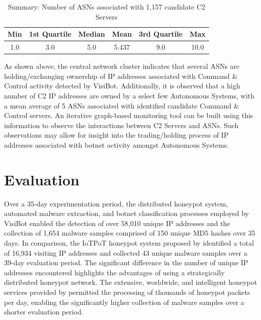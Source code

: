 \begin{table}[!htb]
    \centering
    \caption{Summary: Number of ASNs associated with 1,157 candidate C2 Servers}
    \label{tab:c2_asn_history_summary}
    \begin{tabular}{|c|c|c|c|c|c|}
    \hline
    \textbf{Min} & \textbf{1st Quartile} & \textbf{Median} & \textbf{Mean} & \textbf{3rd Quartile} & \textbf{Max} \\ \hline
    1.0 & 3.0 & 5.0 & 5.437 & 9.0 & 10.0 \\ \hline
    \end{tabular}
\end{table}

As shown above, the central network cluster indicates that several ASNs are holding/exchanging ownership of IP addresses associated with Command \& Control activity detected by VisiBot. Additionally, it is observed that a high number of C2 IP addresses are owned by a select few Autonomous Systems, with a mean average of 5 ASNs associated with identified candidate Command \& Control servers. An iterative graph-based monitoring tool can be built using this information to observe the interactions between C2 Servers and ASNs. Such observations may allow for insight into the trading/holding process of IP addresses associated with botnet activity amongst Autonomous Systems.


\section{Evaluation}

Over a 35-day experimentation period, the distributed honeypot system, automated malware extraction, and botnet classification processes employed by VisiBot enabled the detection of over 58,010 unique IP addresses and the collection of 1,654 malware samples comprised of 150 unique MD5 hashes over 35 days. In comparison, the IoTPoT honeypot system proposed by \citet{PaPa2016} identified a total of 16,934 visiting IP addresses and collected 43 unique malware samples over a 39-day evaluation period. The significant difference in the number of unique IP addresses encountered highlights the advantages of using a strategically distributed honeypot network. The extensive, worldwide, and intelligent honeypot services provided by \citet{BadPackets} permitted the processing of thousands of honeypot packets per day, enabling the significantly higher collection of malware samples over a shorter evaluation period.


